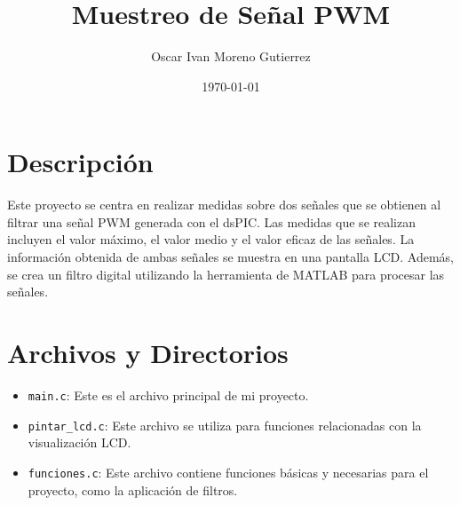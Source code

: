 \documentclass{article}
\title{Muestreo de Señal PWM}
\author{Oscar Ivan Moreno Gutierrez}
\date{\today}
\begin{document}
\maketitle

\section{Descripción}
Este proyecto se centra en realizar medidas sobre dos señales que se obtienen al filtrar una señal PWM generada con el dsPIC. Las medidas que se realizan incluyen el valor máximo, el valor medio y el valor eficaz de las señales. La información obtenida de ambas señales se muestra en una pantalla LCD. Además, se crea un filtro digital utilizando la herramienta de MATLAB para procesar las señales.
\section{Archivos y Directorios}
\begin{itemize}
\item \texttt{main.c}: Este es el archivo principal de mi proyecto.
\item \texttt{pintar\_lcd.c}: Este archivo se utiliza para funciones relacionadas con la visualización LCD.
\item \texttt{funciones.c}: Este archivo contiene funciones básicas y necesarias para el proyecto, como la aplicación de filtros.
\end{itemize}
\end{document}
